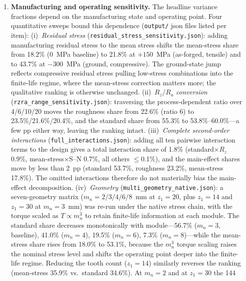 \documentclass[twocolumn,12pt,a4paper]{article}
\begin{document}
\begin{enumerate}
  \item \textbf{Manufacturing and operating sensitivity.} The
        headline variance fractions depend on the manufacturing state
        and operating point. Four quantitative sweeps bound this
        dependence (\texttt{output/} json files listed per item):
        (i)~\emph{Residual stress}
        (\texttt{residual\_stress\_sensitivity.json}): adding
        manufacturing residual stress to the mean stress shifts the
        mean-stress share from 18.2\% (0~MPa baseline) to 21.8\% at
        $+150$~MPa (as-forged, tensile) and to 43.7\% at $-300$~MPa
        (ground, compressive). The ground-state jump reflects
        compressive residual stress pulling low-stress combinations
        into the finite-life regime, where the mean-stress correction
        matters more; the qualitative ranking is otherwise unchanged.
        (ii)~\emph{$R_z/R_a$ conversion}
        (\texttt{rzra\_range\_sensitivity.json}): traversing the
        process-dependent ratio over 4/6/10/20 moves the roughness
        share from 22.6\% (ratio 6) to 23.5\%/21.6\%/20.4\%, and the
        standard share from 55.3\% to 53.8\%--60.0\%---a few pp
        either way, leaving the ranking intact.
        (iii)~\emph{Complete second-order interactions}
        (\texttt{full\_interactions.json}): adding all ten pairwise
        interaction terms to the design gives a total interaction share
        of 1.8\% (standard$\times$$R_z$ 0.9\%, mean-stress$\times$S--N
        0.7\%, all others $\leq$0.1\%), and the main-effect shares move
        by less than 2~pp (standard 53.7\%, roughness 23.2\%,
        mean-stress 17.8\%). The omitted interactions therefore do not
        materially bias the main-effect decomposition.
        (iv)~\emph{Geometry}
        (\texttt{multi\_geometry\_native.json}): a seven-geometry
        matrix ($m_n = 2/3/4/6/8$~mm at $z_1=20$, plus $z_1=14$ and
        $z_1=30$ at $m_n=3$~mm) was re-run under the native stress
        chain, with the torque scaled as $T \propto m_n^3$ to retain
        finite-life information at each module. The standard share
        decreases monotonically with module---56.7\% ($m_n=3$,
        baseline), 41.0\% ($m_n=4$), 19.5\% ($m_n=6$), 7.3\%
        ($m_n=8$)---while the mean-stress share rises from 18.0\% to
        53.1\%, because the $m_n^3$ torque scaling raises the nominal
        stress level and shifts the operating point deeper into the
        finite-life regime. Reducing the tooth count ($z_1=14$)
        similarly reverses the ranking (mean-stress 35.9\% vs.\
        standard 34.6\%). At $m_n=2$ and at $z_1=30$ the 144
$$
\end{enumerate}
\end{document}
